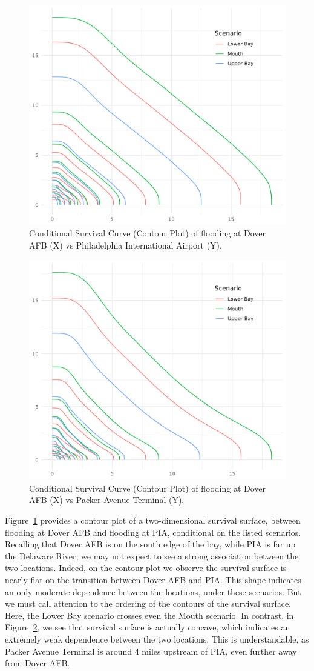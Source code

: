 \begin{figure}[htb]
    \centering
    \includegraphics[width=0.3\linewidth]{./plots/condsurv/doverafb_pia}
    \caption{Conditional Survival Curve (Contour Plot) of flooding at Dover AFB (X) vs Philadelphia International 
        Airport (Y).\label{fig:condsurv2d:doverpia}
        }
\end{figure}

\begin{figure}[htb]
    \centering
    \includegraphics[width=0.3\linewidth]{./plots/condsurv/doverafb_packer}
    \caption{Conditional Survival Curve (Contour Plot) of flooding at Dover AFB (X) vs Packer Avenue Terminal (Y).
        \label{fig:condsurv2d:doverpacker}
        }
\end{figure}

Figure~\ref{fig:condsurv2d:doverpia} provides a contour plot of a two-dimensional survival surface, between
    flooding at Dover AFB and flooding at PIA, conditional on the listed scenarios.  Recalling that Dover AFB 
    is on the south edge of the bay, while PIA is far up the Delaware River, we may not expect to see a strong
    association between the two locations.  Indeed, on the contour plot we observe the survival surface is nearly 
    flat on the transition between Dover AFB and PIA.   This shape indicates
    an only moderate dependence between the locations, under these scenarios.  But we must call 
    attention to the ordering of the contours of the survival surface.  Here, the Lower Bay scenario crosses 
    even the Mouth scenario.  In contrast, in Figure~\ref{fig:condsurv2d:doverpacker}, we see that survival
    surface is actually concave, which indicates an extremely weak dependence between the two 
    locations.  This is understandable, as Packer Avenue Terminal is around 4 miles upstream of PIA,
    even further away from Dover AFB.    
    

